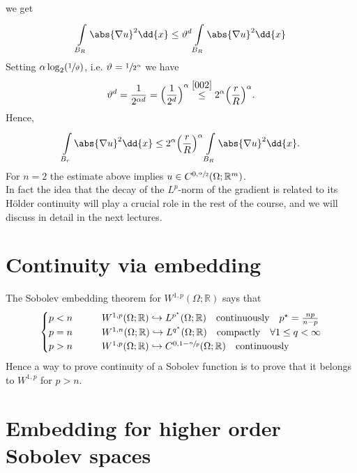 we get
\begin{gather}
	\int\limits_{B_{R}}^{} \abs{\nabla u}^{2} \dd{x} \leq \vartheta^{d}\int\limits_{B_{R}}^{} \abs{\nabla u}^{2} \dd{x}
\end{gather}
Setting \(\alpha \log_{2}(\sfrac{1}{\vartheta})\), i.e. \(\vartheta = \sfrac{1}{2^{\alpha}}\) we have
\begin{gather}
	\vartheta^{d}= \frac{1}{2^{\alpha d}} = {\Big( \frac{1}{2^{d}} \Big)}^{\alpha} \overset{\eqref{002}}{\leq} 2^{\alpha}{\Big( \frac{r}{R} \Big)}^{\alpha}.
\end{gather}
Hence,
\begin{gather}
	\int\limits_{B_{r}}^{} \abs{\nabla u}^{2} \dd{x} \leq 2^{\alpha} {\Big( \frac{r}{R} \Big)}^{\alpha} \int\limits_{B_{R}}^{} \abs{\nabla u}^{2} \dd{x}.
\end{gather}
For \(n=2\) the estimate above implies \(u \in C^{0, \sfrac{\alpha}{2}}(\Omega; \mathbb{R}^{m})\).\\
In fact the idea that the decay of the \(L^{p}\)-norm of the gradient is related to its Hölder continuity will play a crucial role in the rest of the course, and we will discuss in detail in the next lectures.

\section{Continuity via embedding}

The Sobolev embedding theorem for \(W^{1,p}(\Omega; \mathbb{R})\) says that
\begin{align}
	\begin{cases}
		p<n \qquad   & W^{1,p}(\Omega; \mathbb{R}) \hookrightarrow L^{p^{\star}}(\Omega;\mathbb{R}) \quad \text{continuously} \quad p^{\star}=\frac{np}{n-p} \\
		p=n \qquad   & W^{1,n}(\Omega; \mathbb{R}) \hookrightarrow L^{q^{\star}}(\Omega;\mathbb{R}) \quad \text{compactly} \quad \forall 1 \leq q < \infty   \\
		p > n \qquad & W^{1,p}(\Omega; \mathbb{R}) \hookrightarrow C^{0, 1-\sfrac{n}{p}}(\Omega;\mathbb{R}) \quad \text{continuously}
	\end{cases}
\end{align}
Hence a way to prove continuity of a Sobolev function is to prove that it belongs to \(W^{1,p}\) for \(p>n\).

\section{Embedding for higher order Sobolev spaces}

